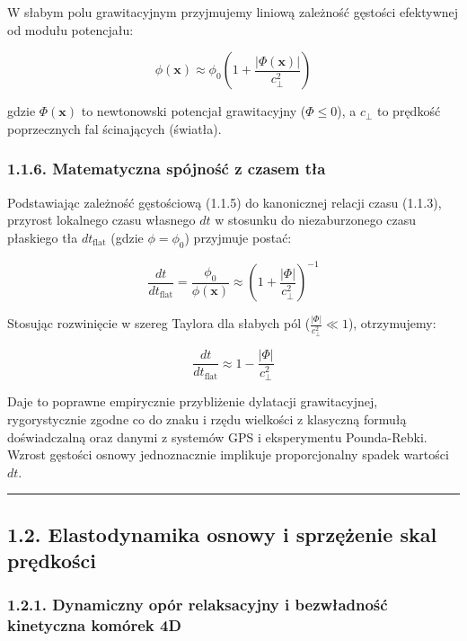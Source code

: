\documentclass[
  letterpaper,
  DIV=11,
  numbers=noendperiod]{scrartcl}
\numberwithin{equation}{subsection}
\begin{document}
W słabym polu grawitacyjnym przyjmujemy liniową zależność gęstości
efektywnej od modułu potencjału:

\[\phi(\mathbf{x}) \approx \phi_0 \left(1 + \frac{|\Phi(\mathbf{x})|}{c_{\perp}^2}\right) \tag{1.1.4}\]

gdzie \(\Phi(\mathbf{x})\) to newtonowski potencjał grawitacyjny
(\(\Phi \le 0\)), a \(c_{\perp}\) to prędkość poprzecznych fal
ścinających (światła).

\subsubsection{1.1.6. Matematyczna spójność z czasem
tła}\label{matematyczna-spuxf3jnoux15bux107-z-czasem-tux142a}

Podstawiając zależność gęstościową (1.1.5) do kanonicznej relacji czasu
(1.1.3), przyrost lokalnego czasu własnego \(dt\) w stosunku do
niezaburzonego czasu płaskiego tła \(dt_{\text{flat}}\) (gdzie
\(\phi = \phi_0\)) przyjmuje postać:

\[\frac{dt}{dt_{\text{flat}}} = \frac{\phi_0}{\phi(\mathbf{x})} \approx \left(1 + \frac{|\Phi|}{c_{\perp}^2}\right)^{-1} \tag{1.1.5a}\]

Stosując rozwinięcie w szereg Taylora dla słabych pól
(\(\frac{|\Phi|}{c_{\perp}^2} \ll 1\)), otrzymujemy:

\[\frac{dt}{dt_{\text{flat}}} \approx 1 - \frac{|\Phi|}{c_{\perp}^2} \tag{1.1.5b}\]

Daje to poprawne empirycznie przybliżenie dylatacji grawitacyjnej,
rygorystycznie zgodne co do znaku i rzędu wielkości z klasyczną formułą
doświadczalną oraz danymi z systemów GPS i eksperymentu Pounda-Rebki.
Wzrost gęstości osnowy jednoznacznie implikuje proporcjonalny spadek
wartości \(dt\).

\begin{center}\rule{0.5\linewidth}{0.5pt}\end{center}

\subsection{1.2. Elastodynamika osnowy i sprzężenie skal
prędkości}\label{elastodynamika-osnowy-i-sprzux119ux17cenie-skal-prux119dkoux15bci}

\subsubsection{1.2.1. Dynamiczny opór relaksacyjny i bezwładność
kinetyczna komórek
4D}\label{dynamiczny-opuxf3r-relaksacyjny-i-bezwux142adnoux15bux107-kinetyczna-komuxf3rek-4d}
\end{document}
